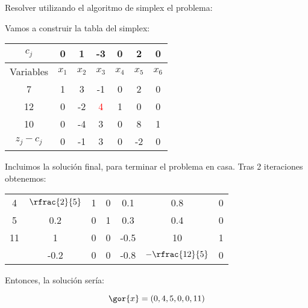 \begin{problem}[1]

Resolver utilizando el algoritmo de simplex el problema:

\begin{ioprob}
\end{ioprob}

\solution

Vamos a construir la tabla del simplex:


\begin{table}[hbtp]
\centering
\begin{tabular}{c|cccccc}
$c_j$&0&1&-3&0&2&0\\\hline
Variables & $x_1$&$x_2$&$x_3$&$x_4$&$x_5$&$x_6$\\\hline
7&1&3&-1&0&2&0\\
12&0&-2&\textcolor{red}{4}&1&0&0\\
10&0&-4&3&0&8&1\\\hline
$z_j - c_j$ & 0&-1&3&0&-2&0
\end{tabular}
\end{table}

Incluimos la solución final, para terminar el problema en casa.
%
Tras 2 iteraciones obtenemos:


\begin{table}[hbtp]
\centering
\begin{tabular}{c|cccccc}
\hline
4&$\rfrac{2}{5}$&1&0&0.1&0.8&0\\
5&0.2&0&1&0.3&0.4&0\\
11&1&0&0&-0.5&10&1\\\hline
&-0.2&0&0&-0.8&$-\rfrac{12}{5}$&0
\end{tabular}
\end{table}

Entonces, la solución sería:

\[
\gor{x} = (0,4,5,0,0,11)
\]
\end{problem}

\begin{problem}

\solution
{}
\end{problem}


